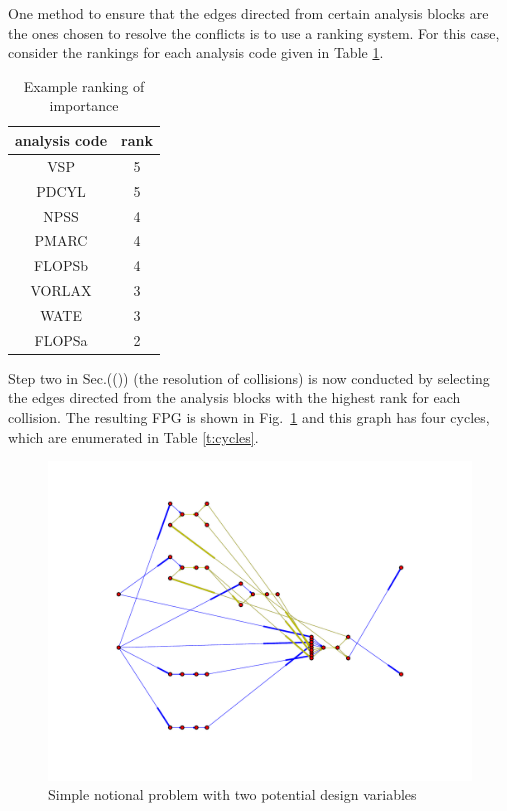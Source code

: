 One method to ensure that the edges directed from certain analysis blocks are the ones chosen to resolve the conflicts is to use a ranking system. For this case, consider the rankings for each analysis code given in Table \ref{t:rankings}.
\begin{table}[htbp]
  \centering
  \caption{Example ranking of importance}
    \begin{tabular}{cc}
    \toprule
    analysis code & rank \\
    \midrule
    VSP   & 5 \\
    PDCYL & 5 \\
    NPSS  & 4 \\
    PMARC & 4 \\
    FLOPSb & 4 \\
    VORLAX & 3 \\
    WATE  & 3 \\
    FLOPSa & 2 \\
    \bottomrule
    \end{tabular}%
  \label{t:rankings}%
\end{table}%
Step two in Sec.(()) (the resolution of collisions) is now conducted by selecting the edges directed from the analysis blocks with the highest rank for each collision. The resulting FPG is shown in Fig.~\ref{f:FPG highest rank} and this graph has four cycles, which are enumerated in Table \ref{t:cycles}.
\begin{figure}[htb!]
  \begin{center}
    \includegraphics[width=.6\textwidth]{images/FPG_highest_rank}
  \end{center}
  \caption{Simple notional problem with two potential design variables \label{f:design vars}}
\label{f:FPG highest rank}
\end{figure}
